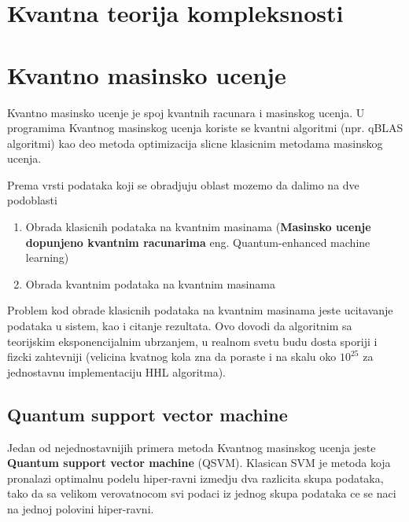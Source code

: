 \documentclass[12pt, letterpaper, oneside]{article}
\begin{document}
\section{Kvantna teorija kompleksnosti}
\section{Kvantno masinsko ucenje}
Kvantno masinsko ucenje je spoj kvantnih racunara i masinskog ucenja. U programima Kvantnog masinskog ucenja koriste se kvantni algoritmi (npr. qBLAS algoritmi)
kao deo metoda optimizacija slicne klasicnim metodama masinskog ucenja. 

Prema vrsti podataka koji se obradjuju oblast mozemo da dalimo na dve podoblasti
\begin{enumerate}
    \item Obrada klasicnih podataka na kvantnim masinama (\textbf{Masinsko ucenje dopunjeno kvantnim racunarima} eng. Quantum-enhanced machine learning)
    \item Obrada kvantnim podataka na kvantnim masinama
\end{enumerate}
Problem kod obrade klasicnih podataka na kvantnim masinama jeste ucitavanje podataka u sistem, kao i citanje rezultata. Ovo dovodi da algoritnim sa teorijskim eksponencijalnim
ubrzanjem, u realnom svetu budu dosta sporiji i fizcki zahtevniji (velicina kvatnog kola zna da poraste i na skalu oko $10^{25}$ za jednostavnu implementaciju HHL algoritma). \cite{Quantum_machine_learning}

\subsection{Quantum support vector machine}
Jedan od nejednostavnijih primera metoda Kvantnog masinskog ucenja jeste \textbf{Quantum support vector machine} (QSVM). Klasican SVM je metoda koja pronalazi optimalnu podelu hiper-ravni
izmedju dva razlicita skupa podataka, tako da sa velikom verovatnocom svi podaci iz jednog skupa podataka ce se naci na jednoj polovini hiper-ravni. \cite{Quantum_machine_learning}
\end{document}
